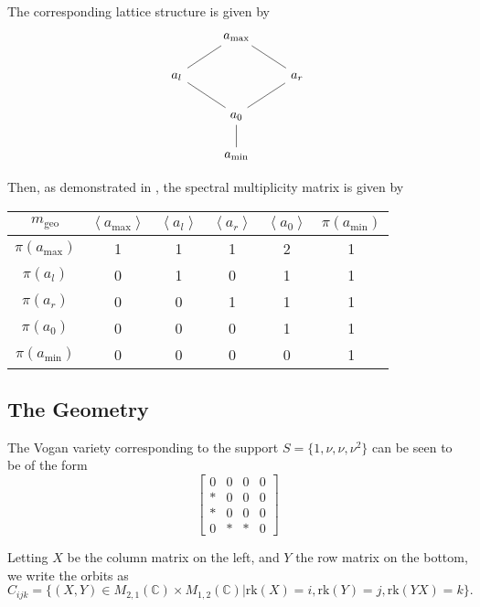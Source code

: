 \documentclass{memoir}
\newcommand{\la}{\left\langle}
\newcommand{\ra}{\right\rangle}
\newcommand{\bc}{\mathbb{C}}
\newcommand{\tx}{\text}
\theoremstyle{definition}
\begin{document}
	The corresponding lattice structure is given by 
	$$\begin{tikzcd}
		& {a_{\text{max}}} \\
		{a_l} && {a_r} \\
		& {a_0} \\
		& {a_{\text{min}}}
		\arrow[no head, from=2-1, to=1-2]
		\arrow[no head, from=1-2, to=2-3]
		\arrow[no head, from=2-1, to=3-2]
		\arrow[no head, from=2-3, to=3-2]
		\arrow[no head, from=3-2, to=4-2]
	\end{tikzcd}$$
	
	Then, as demonstrated in \cite{ZelI2}, the spectral multiplicity matrix is given by
	\begin{center}
		\begin{tabular}{ c c c c c c}
			$m_{\tx{geo}}$ & $\la a_{\tx{max}}\ra$ & $\la a_l\ra$ & $\la a_r\ra$ & $\la a_0\ra$ & $\pi(a_{\tx{min}})$ \\
			\hline 
			$\pi(a_{\tx{max}})$ & 1 & 1 & 1 & 2 & 1\\
			$\pi(a_l)$ & 0 & 1 & 0 & 1 & 1 \\
			$\pi(a_r)$ & 0 & 0 & 1 & 1 & 1 \\
			$\pi(a_0)$ & 0 & 0 & 0 & 1 & 1 \\
			$\pi(a_{\tx{min}})$ & 0 & 0 &  0& 0 & 1 \\
		\end{tabular}
	\end{center}
	
	
	
	
	
	
	
	
	
	
	
	\subsection{The Geometry} 
	
	The Vogan variety corresponding to the support $S=\{1, \nu, \nu, \nu^2\}$ can be seen to be of the form
	$$\begin{bmatrix}
		0 & 0 & 0 & 0 \\
		\ast & 0 & 0 & 0 \\
		\ast & 0 & 0 & 0 \\
		0 & \ast & \ast & 0
	\end{bmatrix}$$
	
	Letting $X$ be the column matrix on the left, and $Y$ the row matrix on the bottom, we write the orbits as 
	$$C_{ijk}=\{(X, Y)\in M_{2,1}(\bc)\times M_{1,2}(\bc) | \tx{rk}(X)=i, \tx{rk}(Y)=j, \tx{rk}(YX)=k\}.$$
	
\end{document}

